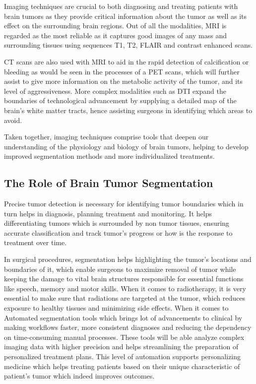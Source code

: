 \documentclass[conference]{IEEEtran}
\begin{document}
Imaging techniques are crucial to both diagnosing and treating patients with brain tumors as they provide critical information about the tumor as well as its effect on the surrounding brain regions. Out of all the modalities, MRI is regarded as the most reliable as it captures good images of any mass and surrounding tissues using sequences T1, T2, FLAIR and contrast enhanced scans.

CT scans are also used with MRI to aid in the rapid detection of calcification or bleeding as would be seen in the processes of a PET scans, which will further assist to give more information on the metabolic activity of the tumor, and its level of aggressiveness. More complex modalities such as DTI expand the boundaries of technological advancement by supplying a detailed map of the brain’s white matter tracts, hence assisting surgeons in identifying which areas to avoid.

Taken together, imaging techniques comprise tools that deepen our understanding of the physiology and biology of brain tumors, helping to develop improved segmentation methods and more individualized treatments.


\subsection{The Role of Brain Tumor Segmentation}
Precise tumor detection is necessary for identifying tumor boundaries which in turn helps in diagnosis, planning treatment and monitoring. It helps differentiating tumors which is surrounded by non tumor tissues, ensuring accurate classification and track tumor's progress or how is the response to treatment over time.

In surgical procedures, segmentation helps highlighting the tumor's locations and boundaries of it, which enable surgeons to maximize removal of tumor while keeping the damage to vital brain structures responsible for essential functions like speech, memory and motor skills. When it comes to radiotherapy, it is very essential to make sure that radiations are targeted at the tumor, which reduces exposure to healthy tissues and minimizing side effects.
When it comes to Automated segmentation tools which brings lot of advancements to clinical by making workflows faster, more consistent diagnoses and reducing the dependency on time-consuming manual processes. These tools will be able analyze complex imaging data with higher precision and helps streamlining the preparation of personalized treatment plans. This level of automation supports personalizing medicine which helps treating patients based on their unique characteristic of patient's tumor which indeed improves outcomes.
\end{document}
